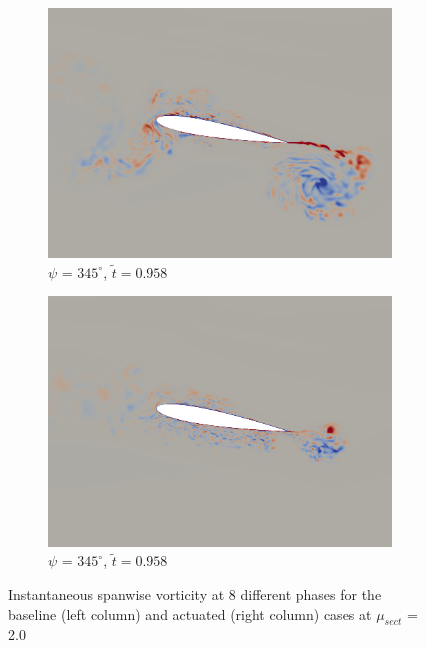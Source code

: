 \begin{figure}[H]
	\begin{subfigure}[b]{0.4\textwidth}
		\centering
		\includegraphics[width=1\textwidth]{figures/mu_2pt0/vorticity/baseline/phase_345.png}
		\caption{ $\psi$ = $345^\circ$, $\tilde{t}=0.958$}
		\label{fig:mu_2pt0_baseline_psi345}
	\end{subfigure}
	\begin{subfigure}[b]{0.4\textwidth}
		\centering
		\includegraphics[width=1\textwidth]{figures/mu_2pt0/vorticity/AC/phase_345.png}
		\caption{ $\psi$ = $345^\circ$, $\tilde{t}=0.958$}
		\label{fig:mu_2pt0_AC_psi345}
	\end{subfigure}
	\caption{Instantaneous spanwise vorticity at 8 different phases for the baseline (left column) and actuated (right column) cases at $\mu_{sect}$ = 2.0}
	\label{fig:vortScreen_mu2pt0}
\end{figure}

